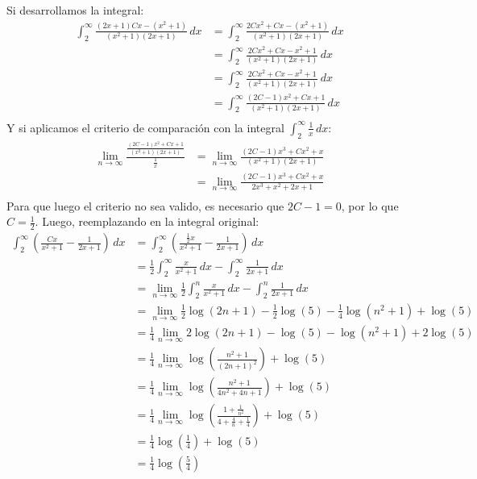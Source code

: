 \documentclass[../main.tex]{subfiles}
\begin{document}
Si desarrollamos la integral:
\begin{align*}
    \int_{2}^\infty \frac{(2x+1)Cx - (x^2+1)}{(x^2+1)(2x+1)} \, dx &= \int_{2}^\infty \frac{2Cx^2+Cx - (x^2+1)}{(x^2+1)(2x+1)} \, dx \\
    &= \int_{2}^\infty \frac{2Cx^2+Cx - x^2+1}{(x^2+1)(2x+1)} \, dx \\
    &= \int_{2}^\infty \frac{2Cx^2+Cx - x^2+1}{(x^2+1)(2x+1)} \, dx \\
    &= \int_{2}^\infty \frac{(2C-1)x^2+Cx +1}{(x^2+1)(2x+1)} \, dx \\
\end{align*}
Y si aplicamos el criterio de comparación con la integral $\int_{2}^\infty \frac{1}{x} \, dx$:
\begin{align*}
    \lim_{n \to \infty} \frac{\frac{(2C-1)x^2+Cx +1}{(x^2+1)(2x+1)}}{\frac{1}{x}} &= \lim_{n \to \infty} \frac{(2C-1)x^3 + Cx^2 + x}{(x^2+1)(2x+1)}\\
    &= \lim_{n \to \infty} \frac{(2C-1)x^3 + Cx^2 + x}{2x^3 + x^2 + 2x + 1}\\
\end{align*}
Para que luego el criterio no sea valido, es necesario que $2C-1 = 0$, por lo que $C = \frac{1}{2}$. Luego, reemplazando en la integral original:
\begin{align*}
    \int_{2}^\infty \left(\frac{Cx}{x^2+1} - \frac{1}{2x+1}\right) \, dx &= \int_{2}^\infty \left(\frac{\frac{1}{2}x}{x^2+1} - \frac{1}{2x+1}\right) \, dx\\
    &= \frac{1}{2} \int_{2}^\infty \frac{x}{x^2+1} \, dx - \int_{2}^\infty \frac{1}{2x+1} \, dx\\
    &=  \lim_{n \to \infty} \frac{1}{2}\int_{2}^n \frac{x}{x^2+1} \, dx - \int_{2}^n \frac{1}{2x+1} \, dx\\
    &=  \lim_{n \to \infty} \frac{1}{2} \log(2n+1) - \frac{1}{2} \log(5) - \frac{1}{4}\log(n^2+1) + \log(5)\\
    &= \frac{1}{4} \lim_{n \to \infty} 2\log(2n+1) - \log(5) - \log(n^2+1) + 2\log(5)\\
    &= \frac{1}{4} \lim_{n \to \infty} \log\left(\frac{n^2+1}{(2n+1)^2}\right) + \log(5)\\
    &= \frac{1}{4} \lim_{n \to \infty} \log\left(\frac{n^2+1}{4n^2 + 4n + 1}\right) + \log(5)\\
    &= \frac{1}{4} \lim_{n \to \infty} \log\left(\frac{1 + \frac{1}{n^2}}{4 + \frac{4}{n} + \frac{1}{4}}\right) + \log(5)\\
    &= \frac{1}{4} \log\left(\frac{1}{4}\right) + \log(5)\\
    &= \frac{1}{4} \log\left(\frac{5}{4}\right)
\end{align*}
\end{document}
